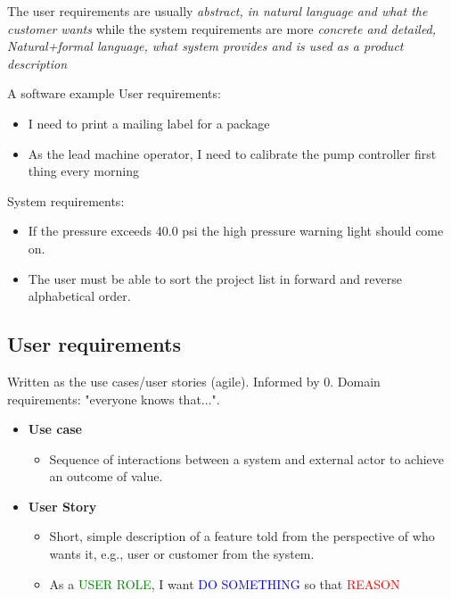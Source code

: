 The user requirements are usually \emph{abstract, in natural language and what the customer wants} while the system requirements are more \emph{concrete and detailed, Natural+formal language, what system provides and is used as a product description }

\begin{example}{A software example}
User requirements:
\begin{itemize}
	\item I need to print a mailing label for a package
	\item As the lead machine operator, I need to calibrate the pump controller first thing every morning
\end{itemize}

System requirements:
\begin{itemize}
	\item If the pressure exceeds 40.0 psi	the high pressure warning light should come on.
	\item The user must be able to sort the project list in forward and reverse alphabetical order. 
\end{itemize}
\end{example}	



\subsection{User requirements}
Written as the use cases/user stories (agile). Informed by 0. Domain requirements: "everyone knows that...". 
\begin{itemize}
	\item \textbf{Use case} 
		\begin{itemize}
			\item Sequence of interactions between a system and external actor to achieve an outcome of value. 
		\end{itemize}
	\item \textbf{User Story} 
		\begin{itemize}
			\item Short, simple description of a feature told from the perspective of who wants it, e.g., user or customer from the system.
			\item As a \textcolor{green}{USER ROLE}, I want \textcolor{blue}{DO SOMETHING} so that \textcolor{red}{REASON}  	
		\end{itemize}
\end{itemize}


